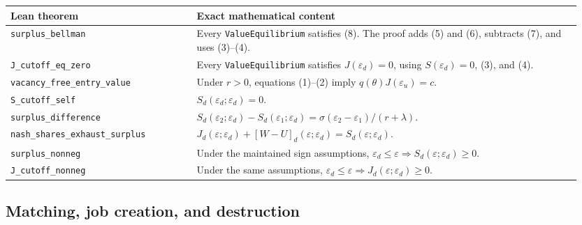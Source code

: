 \documentclass[11pt]{article}
\newcommand{\code}[1]{\texttt{#1}}
\newcommand{\breakcode}[1]{\nolinkurl{#1}}
\newcommand{\epsd}{\varepsilon_d}
\newcommand{\epsu}{\varepsilon_u}
\begin{document}
\begin{longtable}{@{}p{0.31\linewidth}p{0.64\linewidth}@{}}
\toprule
\textbf{Lean theorem} & \textbf{Exact mathematical content} \\
\midrule
\endhead
\breakcode{surplus_bellman} & Every \code{ValueEquilibrium} satisfies (8). The proof
adds (5) and (6), subtracts (7), and uses (3)--(4). \\
\breakcode{J_cutoff_eq_zero} & Every \code{ValueEquilibrium} satisfies
$J(\epsd)=0$, using $S(\epsd)=0$, (3), and (4). \\
\breakcode{vacancy_free_entry_value} & Under $r>0$, equations (1)--(2) imply
$q(\theta)J(\epsu)=c$. \\
\breakcode{S_cutoff_self} & $S_d(\epsd;\epsd)=0$. \\
\breakcode{surplus_difference} &
$S_d(\varepsilon_2;\epsd)-S_d(\varepsilon_1;\epsd)
=\sigma(\varepsilon_2-\varepsilon_1)/(r+\lambda)$. \\
\breakcode{nash_shares_exhaust_surplus} &
$J_d(\varepsilon;\epsd)+[W-U]_d(\varepsilon;\epsd)=S_d(\varepsilon;\epsd)$. \\
\breakcode{surplus_nonneg} & Under the maintained sign assumptions,
$\epsd\le\varepsilon\Rightarrow S_d(\varepsilon;\epsd)\ge0$. \\
\breakcode{J_cutoff_nonneg} & Under the same assumptions,
$\epsd\le\varepsilon\Rightarrow J_d(\varepsilon;\epsd)\ge0$. \\
\bottomrule
\end{longtable}

\subsection{Matching, job creation, and destruction}
\end{document}
